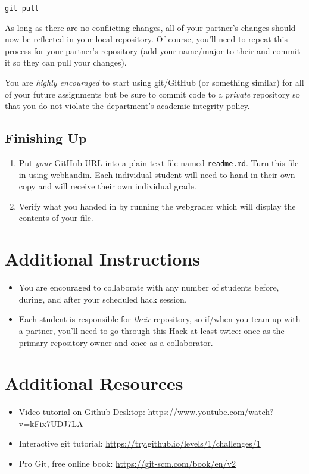 \documentclass[12pt]{scrartcl}
\begin{document}
\texttt{git pull}

As long as there are no conflicting changes, all of your partner's
changes should now be reflected in your local repository.  Of course,
you'll need to repeat this process for your partner's repository (add
your name/major to their and commit it so they can pull your changes).  

You are \emph{highly encouraged} to start using git/GitHub (or 
something similar) for all of your future assignments 
but be sure to commit code to a \emph{private} repository 
so that you do not violate the department's academic integrity 
policy.  

\subsection{Finishing Up}

\begin{enumerate}
  \item Put \emph{your} GitHub URL into a plain text file named 
  \texttt{readme.md}.  Turn this file
  in using webhandin.  Each individual student will need
  to hand in their own copy and will receive their own individual
  grade.
  \item Verify what you handed in by running the webgrader which will
  display the contents of your file.
\end{enumerate}

\section*{Additional Instructions}

\begin{itemize}
  \item You are encouraged to collaborate with any number of students 
  before, during, and after your scheduled hack session.    
  \item Each student is responsible for \emph{their} repository, so 
  if/when you team up with a partner, you'll need to go through this
  Hack at least twice: once as the primary repository owner and once as
  a collaborator.
\end{itemize}
  
\section*{Additional Resources}
\label{section:additionalResources}

\begin{itemize} 
  \item Video tutorial on Github Desktop: \url{https://www.youtube.com/watch?v=kFix7UDJ7LA}
  \item Interactive git tutorial: \url{https://try.github.io/levels/1/challenges/1}
  \item Pro Git, free online book: \url{https://git-scm.com/book/en/v2}
\end{itemize}


  
\end{document}
